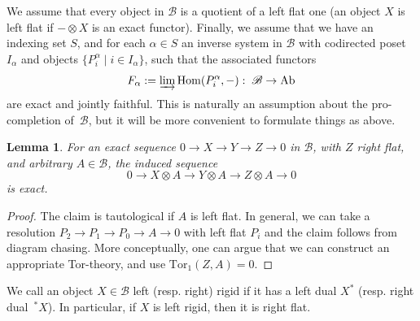 \documentclass[11pt]{amsart}
\def\Hom{\operatorname{Hom}}
\newcommand{\uHom}{\underline{\mathrm{Hom}}}
\def\Tor{\mathrm{Tor}}
\def\Ab{\text{Ab}}
\def\cB{\mathscr{B}}
\newtheorem{lemma}[thm]{Lemma}
\theoremstyle{definition}
\theoremstyle{remark}
\numberwithin{equation}{section}
\begin{document}
We assume that every object in $\cB$ is a quotient of a left flat one (an object $X$ is left flat if $-\otimes X$ is an exact functor). Finally, we assume that we have an indexing set $S$, and for each $\alpha\in S$ an inverse system in $\cB$ with codirected poset $I_\alpha$ and objects $\{P^\alpha_i\mid i\in I_\alpha\}$, such that the associated functors
\[F_\alpha:=\varinjlim\Hom(P_i^\alpha,-):\;\cB\to\Ab\]
are exact and jointly faithful. This is naturally an assumption about the pro-completion of~$\cB$, but it will be more convenient to formulate things as above.


\begin{lemma}\label{lem:1}
    For an exact sequence $0\to X\to Y\to Z\to 0$ in $\cB$, with $Z$ right flat, and arbitrary $A\in\cB$, the induced sequence
    \[0\to X\otimes A\to Y\otimes A\to Z\otimes A\to 0\]
    is exact.
\end{lemma}
\begin{proof}
    The claim is tautological if $A$ is left flat. In general, we can take a resolution $P_2\to P_1\to P_0\to A\to 0$ with  left flat $P_i$ and the claim follows from diagram chasing. More conceptually, one can argue that we can construct an appropriate Tor-theory, and use $\Tor_1(Z,A)=0$.
\end{proof}


We call an object $X\in\cB$ left (resp. right) rigid if it has a left dual $X^\ast$ (resp. right dual~${}^\ast X$). In particular, if $X$ is left rigid, then it is right flat. 
\end{document}
